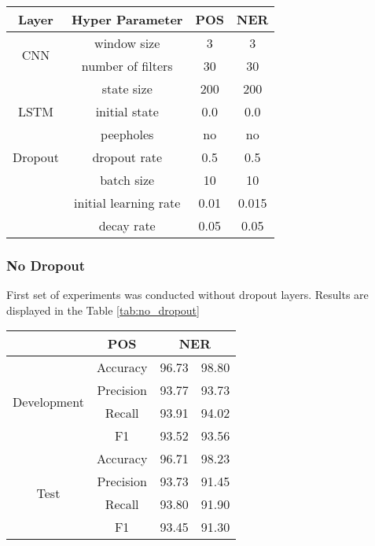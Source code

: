 \begin{center}
\begin{tabular}{ |c|c|c|c| }
\hline
\textbf{Layer} & \textbf{Hyper Parameter} & \textbf{POS} & \textbf{NER} \\ \hline
\multirow{2}{*}{CNN} & window size & 3 & 3 \\
 & number of filters & 30 & 30 \\ \hline
\multirow{3}{*}{LSTM} & state size & 200 & 200 \\
 & initial state & 0.0 & 0.0 \\
 & peepholes & no & no \\ \hline
Dropout & dropout rate & 0.5 & 0.5 \\ \hline
\multirow{2}{*}{} & batch size & 10 & 10\\
 & initial learning rate & 0.01 & 0.015 \\
 & decay rate & 0.05 & 0.05 \\
\hline
\end{tabular}
\label{tab:hyper}
\end{center}

\label{no_dropout}
\subsubsection{No Dropout}
First set of experiments was conducted without dropout layers. Results are
displayed in the Table \ref{tab:no_dropout}

\begin{center}
\begin{tabular}{ |c|c|c|c| }
\hline
& {\textbf{POS}} & \multicolumn{2}{|c|}{\textbf{NER}}\\ \hline
\multirow{4}{*}{Development} & Accuracy & 96.73 & 98.80 \\
 & Precision & 93.77 & 93.73 \\
 & Recall & 93.91 & 94.02 \\
 & F1 & 93.52 & 93.56 \\ \hline
\multirow{4}{*}{Test} & Accuracy & 96.71 & 98.23 \\
 & Precision & 93.73 & 91.45 \\
 & Recall & 93.80 & 91.90 \\
 & F1 & 93.45 & 91.30 \\ \hline
\end{tabular}
\label{tab:no_dropout}
\end{center}


